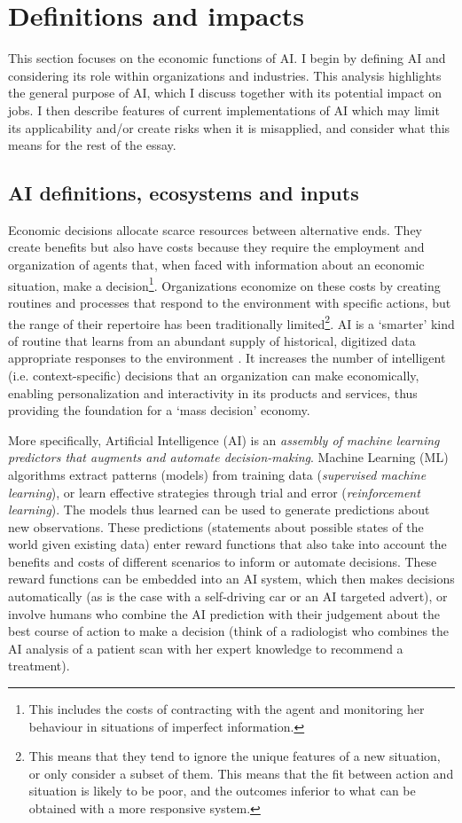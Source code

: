 \documentclass[11pt]{article}
\begin{document}
\section{Definitions and impacts}
\label{sec:definition}

This section focuses on the economic functions of AI. I begin by defining AI and considering its role within organizations and industries. This analysis highlights the general purpose of AI, which I discuss together with its potential impact on jobs. I then describe features of current implementations of AI which may limit its applicability and/or create risks when it is misapplied, and consider what this means for the rest of the essay.

\subsection{AI definitions, ecosystems and inputs}
\label{subsec:systems}
Economic decisions allocate scarce resources between alternative ends. They create benefits but also have costs because they require the employment and organization of agents that, when faced with information about an economic situation, make a decision\footnote{This includes the costs of contracting with the agent and monitoring her behaviour in situations of imperfect information.}. Organizations economize on these costs by creating routines and processes that respond to the environment with specific actions, but the range of their repertoire has been traditionally limited\footnote{This means that they tend to ignore the unique features of a new situation, or only consider a subset of them. This means that the fit between action and situation is likely to be poor, and the outcomes inferior to what can be obtained with a more responsive system.}. AI is a `smarter' kind of routine that learns from an abundant supply of historical, digitized data appropriate responses to the environment . It increases the number of intelligent (i.e. context-specific) decisions that an organization can make economically, enabling personalization and interactivity in its products and services, thus providing the foundation for a `mass decision' economy.

More specifically, Artificial Intelligence (AI) is an \textit{assembly of machine learning predictors that augments and automate decision-making}. Machine Learning (ML) algorithms extract patterns (models) from training data (\textit{supervised machine learning}), or learn effective strategies through trial and error (\textit{reinforcement learning}). The models thus learned can be used to generate predictions about new observations. These predictions (statements about possible states of the world given existing data) enter reward functions that also take into account the benefits and costs of different scenarios to inform or automate decisions. These reward functions can be embedded into an AI system, which then makes decisions automatically (as is the case with a self-driving car or an AI targeted advert), or involve humans who combine the AI prediction with their judgement about the best course of action to make a decision (think of a radiologist who combines the AI analysis of a patient scan with her expert knowledge to recommend a treatment).
\end{document}
